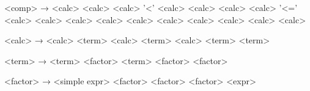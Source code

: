 <comp>           → <calc> \lit{>} <calc>
                 \alt <calc> '\textless' <calc>
                 \alt <calc> \lit{>=} <calc>
                 \alt <calc> '\textless=' <calc>
                 \alt <calc>  <calc>
                 \alt <calc>  <calc>
                 \alt <calc>  <calc>
                 \alt <calc>  <calc>
                 \alt <calc>

<calc>           → <calc> \lit{+} <term>
                 \alt <calc> \lit{-} <term>
                 \alt <calc>  <term>
                 \alt <term>

<term>           → <term> \lit{*} <factor>
                 \alt <term> \lit{/} <factor>
                 \alt <factor>

<factor>         → <simple expr>
                 \alt \lit{!} <factor>
                 \alt \lit{+} <factor>
                 \alt \lit{-} <factor>
                 \alt \lit{(} <expr> \lit{)}
